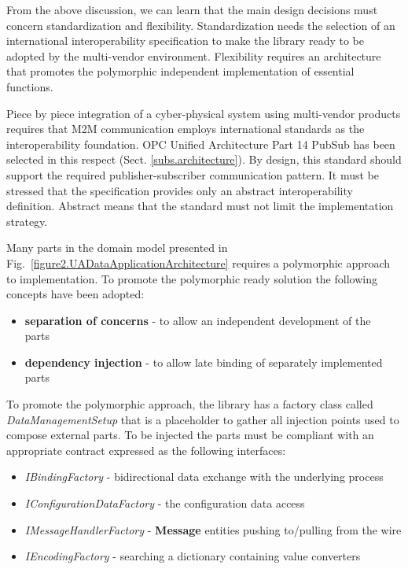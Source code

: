 \documentclass[runningheads]{llncs}
\begin{document}
From the above discussion, we can learn that the main design decisions must concern standardization and flexibility. Standardization needs the selection of an international interoperability specification to make the library ready to be adopted by the multi-vendor environment. Flexibility requires an architecture that promotes the polymorphic independent implementation of essential functions.

Piece by piece integration of a cyber-physical system using multi-vendor products requires that M2M communication employs international standards as the interoperability foundation. OPC Unified Architecture Part 14 PubSub has been selected in this respect (Sect. \ref{subs.architecture}). By design, this standard should support the required publisher-subscriber communication pattern. It must be stressed that the specification provides only an abstract interoperability definition. Abstract means that the standard must not limit the implementation strategy.

Many parts in the domain model presented in Fig.~\ref{figure2.UADataApplicationArchitecture} requires a polymorphic approach to implementation. To promote the polymorphic ready solution the following concepts have been adopted:

\begin{itemize}
      \item \textbf{separation of concerns} - to allow an independent development of the parts~\cite{RefWorks:doc:5d92609be4b02eb43d372bd1}
      \item \textbf{dependency injection} - to allow late binding of separately implemented parts~\cite{RefWorks:doc:5d925b77e4b030b4e0596f5d}
\end{itemize}

To promote the polymorphic approach, the library has a factory class called \emph{DataManagementSetup} that is a placeholder to gather all injection points used to compose external parts. To be injected the parts must be compliant with an appropriate contract expressed as the following interfaces:

\begin{itemize}
      \item \emph{IBindingFactory} - bidirectional data exchange with the underlying process
      \item \emph{IConfigurationDataFactory} - the configuration data access
      \item \emph{IMessageHandlerFactory} - \textbf{Message} entities pushing to/pulling from the wire
      \item \emph{IEncodingFactory} - searching a dictionary containing value converters
\end{itemize}
\end{document}
